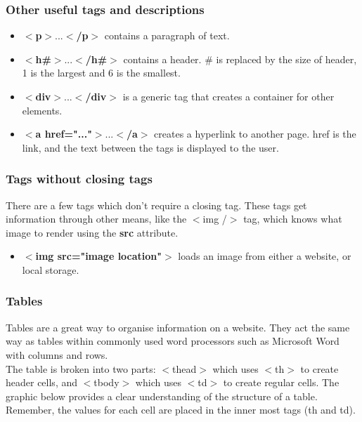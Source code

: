 \documentclass[12pt]{report}
\begin{document}
				\subsubsection{Other useful tags and descriptions}
					\begin{itemize}
						\item $<$\textbf{p}$>$...$<$\textbf{/p}$>$ contains a paragraph of text.
						\item $<$\textbf{h\#}$>$...$<$\textbf{/h\#}$>$ contains a header. \# is replaced by the size of header, 1 is the largest and 6 is the smallest.
						\item $<$\textbf{div}$>$...$<$\textbf{/div}$>$ is a generic tag that creates a container for other elements.
						\item $<$\textbf{a href="..."}$>$...$<$\textbf{/a}$>$ creates a hyperlink to another page. href is the link, and the text between the tags is displayed to the user.
				\end{itemize}
				\subsubsection{\textbf{Tags without closing tags}}

						There are a few tags which don't require a closing tag. These tags get information through other means, like the $<$img /$>$ tag, which knows what image to render using the \textbf{src} attribute.
					\begin{itemize}
						\item $<$\textbf{img src="image location"}$>$ loads an image from either a website, or local storage.

					\end{itemize}

				\vspace{0.5cm}
				\subsubsection{Tables}


				Tables are a great way to organise information on a website. They act the same way as tables within commonly used word processors such as Microsoft Word with columns and rows. \\

				The table is broken into two parts: $<$thead$>$ which uses $<$th$>$ to create header cells, and $<$tbody$>$ which uses $<$td$>$ to create regular cells. The graphic below provides a clear understanding of the structure of a table. Remember, the values for each cell are placed in the inner most tags (th and td).\\
\end{document}
